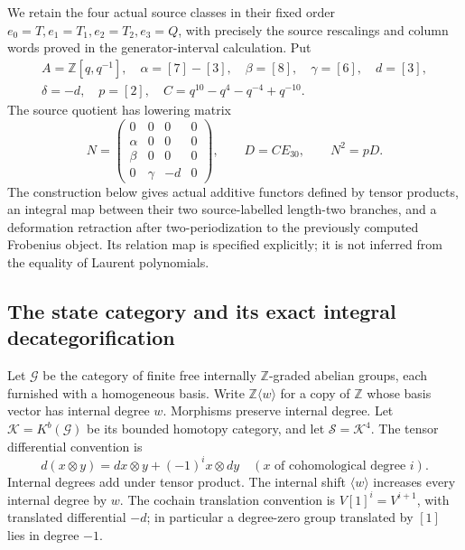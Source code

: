 We retain the four actual source classes in their fixed order
\(e_0=T,e_1=T_1,e_2=T_2,e_3=Q\), with precisely the source rescalings
and column words proved in the generator-interval calculation. Put
\[
 \begin{gathered}
 A=\mathbb Z[q,q^{-1}],\quad
 \alpha=[7]-[3],\quad\beta=[8],\quad\gamma=[6],\quad d=[3],\\
 \delta=-d,\quad p=[2],\quad C=q^{10}-q^4-q^{-4}+q^{-10}.
 \end{gathered}
\]
The source quotient has lowering matrix
\[
 N=\begin{pmatrix}0&0&0&0\\\alpha&0&0&0\\
 \beta&0&0&0\\0&\gamma&-d&0\end{pmatrix},\qquad
 D=CE_{30},\qquad N^2=pD.
\]
The construction below gives actual additive functors defined by tensor
products, an integral map
between their two source-labelled length-two branches, and a deformation
retraction after two-periodization to the previously computed Frobenius
object. Its relation map is specified explicitly; it is not inferred from
the equality of Laurent polynomials.

\subsection{The state category and its exact integral decategorification}

Let \(\mathcal G\) be the category of finite free internally
\(\mathbb Z\)-graded abelian groups, each furnished with a homogeneous
basis. Write \(\mathbb Z\langle w\rangle\) for a copy of \(\mathbb Z\)
whose basis vector has internal degree \(w\). Morphisms preserve internal
degree. Let \(\mathcal K=K^b(\mathcal G)\) be its bounded homotopy category,
and let \(\mathcal S=\mathcal K^4\). The tensor differential convention is
\[
 d(x\otimes y)=dx\otimes y+(-1)^i x\otimes dy
 \quad(x\text{ of cohomological degree }i).
\]
Internal degrees add under tensor product. The internal shift
\(\langle w\rangle\) increases every internal degree by \(w\).
The cochain translation convention is \(V[1]^i=V^{i+1}\), with
translated differential \(-d\); in particular a degree-zero group
translated by \([1]\) lies in degree \(-1\).

